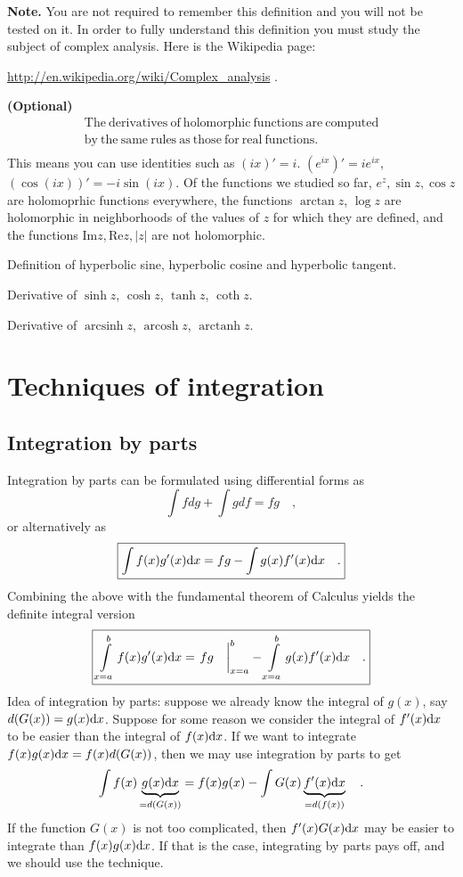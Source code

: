 \documentclass[12pt]{book}
\renewcommand{\Im}{\mathrm{Im}}
\renewcommand{\Re}{\mathrm{Re}}
\newcommand{\importantFormula}[1]{\begin{equation} \boxed{#1} \end{equation}}
\DeclareMathOperator{\arcsinh}{arcsinh}
\DeclareMathOperator{\arccosh}{arcosh}
\DeclareMathOperator{\arctanh}{arctanh}
\newcommand{\optionalMaterial}{\textbf{(Optional)}}
\begin{document}
\textbf{Note.} You are not required to remember this definition and you will not be tested on it. In order to fully understand this definition you must study the subject of complex analysis. Here is the Wikipedia page:

\url{http://en.wikipedia.org/wiki/Complex_analysis} \quad .

\optionalMaterial
\[\begin{array}{l}
\mathrm{The~derivatives~of~holomorphic~functions~are~computed} \\
\mathrm{by~the~same~rules~as~those~for~real~functions.} \\
\end{array}
\]
This means you can use identities such as $(ix)'=i$. $(e^{ix})'=ie^{ix}$, $(\cos (ix))'= -i\sin(ix)$. Of the functions we studied so far, $e^z, \sin z, \cos z$ are holomoprhic functions everywhere, the functions $\arctan z$, $\log z$ are holomorphic in neighborhoods of the values of $z$ for which they are defined, and the functions $\Im z, \Re z, |z|$ are not holomorphic.




Definition of hyperbolic sine, hyperbolic cosine and hyperbolic tangent.

Derivative of $\sinh z$, $\cosh z$, $\tanh z$, $\coth z$.

Derivative of $ \arcsinh z$, $ \arccosh z$, $ \arctanh z$.
\chapter{Techniques of integration}
\section{Integration by parts}
Integration by parts can be formulated using differential forms as
\importantFormula{
\int f dg+ \int g df = fg\quad,
}
or alternatively as
\importantFormula{
\int f(x) g'(x)\diff x = fg- \int g(x) f'(x)\diff x \quad .
}
Combining the above with the fundamental theorem of Calculus yields the definite integral version
\importantFormula{
\int\limits_{x=a}^{b} f(x) g'(x)\diff x = \left.fg\phantom\int\right|_{x=a}^b - \int\limits_{x=a}^b g(x) f'(x)\diff x \quad.
}
Idea of integration by parts: suppose we already know the integral of $g(x)$, say $d(G(x))=g(x){\normalfont \text{d}} x$. Suppose for some reason we consider the integral of $f'(x){\normalfont \text{d}} x$ to be easier than the integral of $f(x){\normalfont \text{d}} x$. If we want to integrate $f(x)g(x){\normalfont \text{d}} x= f(x)d(G(x))$, then we may use integration by parts to get
\[
\int f(x)\underbrace{g(x){\normalfont \text{d}} x}_{=d(G(x))}= f(x)g(x)- \int G(x) \underbrace{f'(x){\normalfont \text{d}} x}_{=d(f(x))}\quad .
\]
If the function $G(x)$ is not too complicated, then $f'(x)G(x){\normalfont \text{d}} x$ may be easier to integrate than $f(x)g(x){\normalfont \text{d}} x$. If that is the case, integrating by parts pays off, and we should use the technique.
\end{document}
